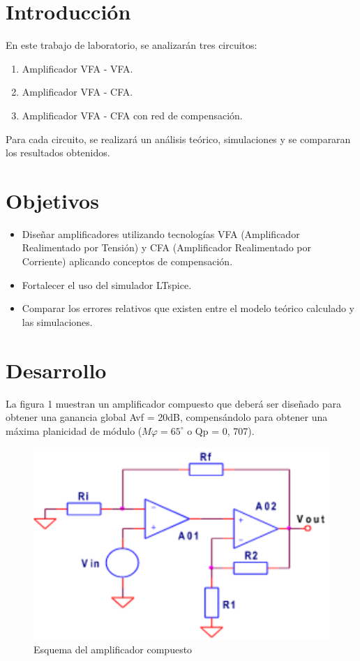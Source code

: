 \documentclass[a4paper,12pt]{article}
\begin{document}
\thispagestyle{empty}
\vspace{0,2cm}
\tableofcontents

\newpage
    \vspace{3cm}
    \section{Introducción}
    \vspace{0,2cm}
\hspace{1mm}En este trabajo de laboratorio, se analizarán tres circuitos: 
\begin{enumerate}
	\item Amplificador VFA - VFA.
	\item Amplificador VFA - CFA.
	\item Amplificador VFA - CFA con red de compensación.
\end{enumerate}
\vspace{0,2cm}
\hspace{1mm}Para cada circuito, se realizará un análisis teórico, simulaciones y se compararan los resultados obtenidos.

\section{Objetivos}
\vspace{0,2cm}
\begin{itemize}
	\item Diseñar amplificadores utilizando tecnologías VFA (Amplificador Realimentado por Tensión) y CFA (Amplificador Realimentado por Corriente) aplicando conceptos de compensación.
	\item Fortalecer el uso del simulador LTspice.
	\item Comparar los errores relativos que existen entre el modelo teórico calculado y las simulaciones.
	
\end{itemize}
\section{Desarrollo}
\vspace{0,2cm}
\hspace{1mm}La figura 1 muestran un amplificador compuesto que deberá ser diseñado para obtener una
ganancia global Avf = 20dB, compensándolo para obtener una máxima planicidad de módulo
($M\varphi =65^\circ$ o Qp = 0, 707).
\begin{figure}[h] 
    \centering
    \includegraphics[width=0.5\linewidth]{Circuito1.png}
    \caption{Esquema del amplificador compuesto}
    \label{fig:enter-label}
\end{figure}
\newpage
\end{document}
